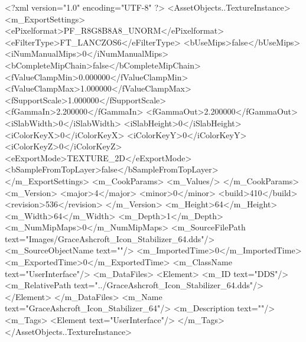 <?xml version="1.0" encoding="UTF-8" ?>
<AssetObjects..TextureInstance>
	<m_ExportSettings>
		<ePixelformat>PF_R8G8B8A8_UNORM</ePixelformat>
		<eFilterType>FT_LANCZOS6</eFilterType>
		<bUseMips>false</bUseMips>
		<iNumManualMips>0</iNumManualMips>
		<bCompleteMipChain>false</bCompleteMipChain>
		<fValueClampMin>0.000000</fValueClampMin>
		<fValueClampMax>1.000000</fValueClampMax>
		<fSupportScale>1.000000</fSupportScale>
		<fGammaIn>2.200000</fGammaIn>
		<fGammaOut>2.200000</fGammaOut>
		<iSlabWidth>0</iSlabWidth>
		<iSlabHeight>0</iSlabHeight>
		<iColorKeyX>0</iColorKeyX>
		<iColorKeyY>0</iColorKeyY>
		<iColorKeyZ>0</iColorKeyZ>
		<eExportMode>TEXTURE_2D</eExportMode>
		<bSampleFromTopLayer>false</bSampleFromTopLayer>
	</m_ExportSettings>
	<m_CookParams>
		<m_Values/>
	</m_CookParams>
	<m_Version>
		<major>4</major>
		<minor>0</minor>
		<build>410</build>
		<revision>536</revision>
	</m_Version>
	<m_Height>64</m_Height>
	<m_Width>64</m_Width>
	<m_Depth>1</m_Depth>
	<m_NumMipMaps>0</m_NumMipMaps>
	<m_SourceFilePath text="Images/GraceAshcroft_Icon_Stabilizer_64.dds"/>
	<m_SourceObjectName text=""/>
	<m_ImportedTime>0</m_ImportedTime>
	<m_ExportedTime>0</m_ExportedTime>
	<m_ClassName text="UserInterface"/>
	<m_DataFiles>
		<Element>
			<m_ID text="DDS"/>
			<m_RelativePath text="../GraceAshcroft_Icon_Stabilizer_64.dds"/>
		</Element>
	</m_DataFiles>
	<m_Name text="GraceAshcroft_Icon_Stabilizer_64"/>
	<m_Description text=""/>
	<m_Tags>
		<Element text="UserInterface"/>
	</m_Tags>
</AssetObjects..TextureInstance>
